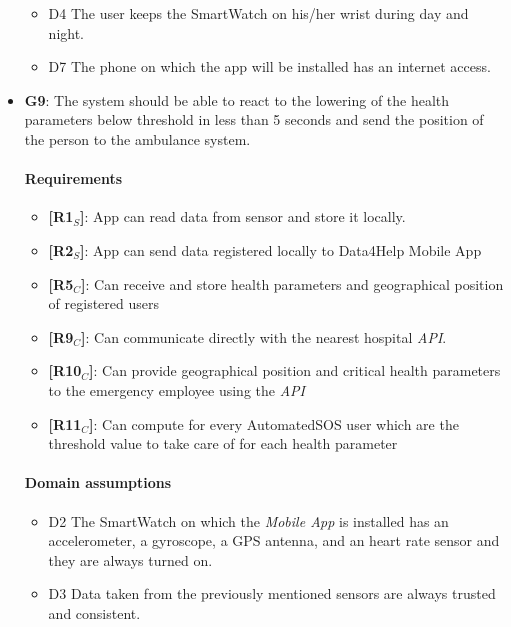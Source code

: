 \begin{itemize}
\begin{itemize}
    \item  D4  The user keeps the SmartWatch on his/her wrist during day and night.
    
     \item  D7  The phone on which the app will be installed has an internet access.
 
   \end{itemize}
   
   
    \item \textbf{G9}: The system should be able to react to the lowering of the health parameters below threshold in less than 5 seconds and send the position of the person to the ambulance system. 
    \paragraph{Requirements}
   \begin{itemize}
    \item \textbf{[R1$_S$]}: App can read data from sensor and store it locally.
    \item \textbf{[R2$_S$]}: App can send data registered locally to Data4Help Mobile App

    \item \textbf{[R5$_C$]}: Can receive and store health parameters and geographical position of registered users

    \item \textbf{[R9$_C$]}: Can communicate directly with the nearest hospital \textit{API}.
    \item \textbf{[R10$_C$]}: Can provide geographical position and critical health parameters to the emergency employee using the \textit{API}
    \item \textbf{[R11$_C$]}: Can compute for every AutomatedSOS user which are the threshold value to take care of for each health parameter

   \end{itemize}
   \paragraph{Domain assumptions}
   \begin{itemize}
    \item  D2  The SmartWatch on which the \textit{Mobile App} is installed has an accelerometer, a gyroscope, a GPS antenna, and an heart rate sensor and they are always turned on.
    
     \item  D3  Data taken from the previously mentioned sensors are always trusted and consistent.
            

\end{itemize}
\end{itemize}
